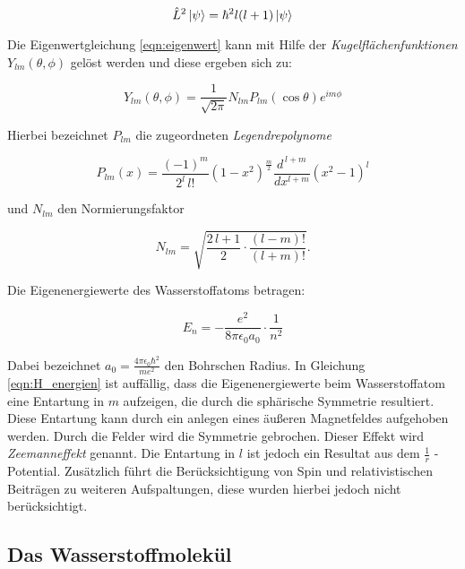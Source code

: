 \begin{equation}
    \hat{L}^2 \ket{\psi} = \hbar^2 l(l+1) \ket{\psi}
    \label{eqn:L}
\end{equation}

Die Eigenwertgleichung \eqref{eqn:eigenwert} kann mit Hilfe der \textit{Kugelflächenfunktionen} $Y_{lm} (\theta, \phi)$ gelöst werden und diese ergeben sich zu:

\begin{equation}
    Y_{lm} (\theta, \phi) = \frac{1}{\sqrt{2 \pi}} N_{lm} P_{lm} (\cos \theta) e^{im\phi}
    \label{eqn:kugelflaechen}
\end{equation}

Hierbei bezeichnet $P_{lm}$ die zugeordneten \textit{Legendrepolynome}

\begin{equation}
    P_{lm} (x) = \frac{(-1)^m}{2^l \, l!} \left( 1-x^2 \right)^{\! \frac{m}{2}} \frac{d^{\, l+m}}{dx^{l+m}} \left( x^2 - 1 \right)^l
    \label{eqn:legendre}
\end{equation}

und $N_{lm}$ den Normierungsfaktor

\begin{equation}
    N_{lm} = \sqrt{\frac{2 \, l +1}{2} \cdot \frac{(l-m)!}{(l+m)!}} .
    \label{eqn:normierung}
\end{equation}

Die Eigenenergiewerte des Wasserstoffatoms betragen:

\begin{equation}
    E_n = - \frac{e^2}{8 \pi \epsilon_0 a_0} \cdot \frac{1}{n^2}
    \label{eqn:H_energien}
\end{equation}

Dabei bezeichnet $a_0 = \frac{4 \pi \epsilon_0 \hbar^2}{m e^2}$ den Bohrschen Radius. In Gleichung \eqref{eqn:H_energien} ist auffällig, dass die Eigenenergiewerte beim Wasserstoffatom eine Entartung in $m$ aufzeigen, die durch die sphärische Symmetrie resultiert. Diese Entartung kann durch ein anlegen eines äußeren Magnetfeldes aufgehoben werden. Durch die Felder wird die Symmetrie gebrochen. Dieser Effekt wird \textit{Zeemanneffekt} genannt. Die Entartung in $l$ ist jedoch ein Resultat aus dem $\frac{1}{r}$ - Potential. Zusätzlich führt die Berücksichtigung von Spin und relativistischen Beiträgen zu weiteren Aufspaltungen, diese wurden hierbei jedoch nicht berücksichtigt.

\subsection{Das Wasserstoffmolekül}
\label{sec:H2}

